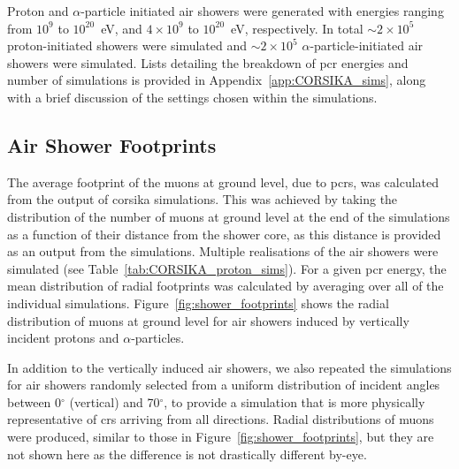 Proton and $\alpha$-particle initiated air showers were generated with energies ranging from $10^{9}$ to $10^{20}$~eV, and $4\times10^{9}$ to $10^{20}$~eV, respectively. In total $\sim 2\times10^5$ proton-initiated showers were simulated and $\sim 2\times10^5$ $\alpha$-particle-initiated air showers were simulated. Lists detailing the breakdown of \gls{pcr} energies and number of simulations is provided in Appendix~\ref{app:CORSIKA_sims}, along with a brief discussion of the settings chosen within the simulations.


\subsection{Air Shower Footprints}\label{sec:CORSIKA_footprint}

The average footprint of the muons at ground level, due to \glspl{pcr}, was calculated from the output of \gls{corsika} simulations. This was achieved by taking the distribution of the number of muons at ground level at the end of the simulations as a function of their distance from the shower core, as this distance is provided as an output from the simulations. Multiple realisations of the air showers were simulated (see Table~\ref{tab:CORSIKA_proton_sims}). For a given \gls{pcr} energy, the mean distribution of radial footprints was calculated by averaging over all of the individual simulations. Figure~\ref{fig:shower_footprints} shows the radial distribution of muons at ground level for air showers induced by vertically incident protons and $\alpha$-particles.

In addition to the vertically induced air showers, we also repeated the simulations for air showers randomly selected from a uniform distribution of incident angles between 0$^\circ$ (vertical) and 70$^\circ$, to provide a simulation that is more physically representative of \glspl{cr} arriving from all directions. Radial distributions of muons were produced, similar to those in Figure~\ref{fig:shower_footprints}, but they are not shown here as the difference is not drastically different by-eye.


